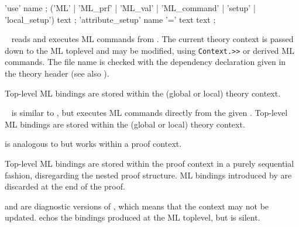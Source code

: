 \begin{isabellebody}
\begin{isamarkuptext}
  \begin{rail}
    'use' name
    ;
    ('ML' | 'ML\_prf' | 'ML\_val' | 'ML\_command' | 'setup' | 'local\_setup') text
    ;
    'attribute\_setup' name '=' text text
    ;
  \end{rail}

  \begin{description}

  \item \hyperlink{command.use}{\mbox{}}~ reads and executes ML
  commands from .  The current theory context is passed
  down to the ML toplevel and may be modified, using \verb|Context.>>| or derived ML commands.  The file name is checked with
  the \hyperlink{keyword.uses}{\mbox{}} dependency declaration given in the theory
  header (see also ).

  Top-level ML bindings are stored within the (global or local) theory
  context.
  
  \item \hyperlink{command.ML}{\mbox{}}~ is similar to \hyperlink{command.use}{\mbox{}},
  but executes ML commands directly from the given .
  Top-level ML bindings are stored within the (global or local) theory
  context.

  \item \hyperlink{command.ML-prf}{\mbox{}} is analogous to \hyperlink{command.ML}{\mbox{}} but works
  within a proof context.

  Top-level ML bindings are stored within the proof context in a
  purely sequential fashion, disregarding the nested proof structure.
  ML bindings introduced by \hyperlink{command.ML-prf}{\mbox{}} are discarded at the
  end of the proof.

  \item \hyperlink{command.ML-val}{\mbox{}} and \hyperlink{command.ML-command}{\mbox{}} are diagnostic
  versions of \hyperlink{command.ML}{\mbox{}}, which means that the context may not be
  updated.  \hyperlink{command.ML-val}{\mbox{}} echos the bindings produced at the ML
  toplevel, but \hyperlink{command.ML-command}{\mbox{}} is silent.
  

\end{description}
\end{isamarkuptext}
\end{isabellebody}
